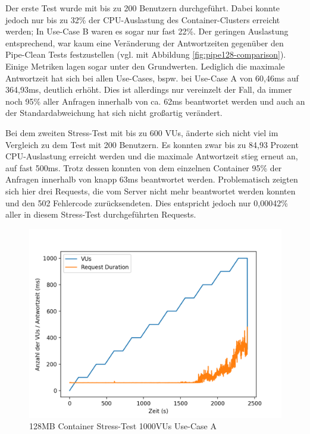 Der erste Test wurde mit bis zu 200 Benutzern durchgeführt. Dabei konnte jedoch nur bis zu 32\% der CPU-Auslastung des Container-Clusters erreicht werden; In Use-Case B waren es sogar nur fast 22\%. Der geringen Auslastung entsprechend, war kaum eine Veränderung der Antwortzeiten gegenüber den Pipe-Clean Tests festzustellen (vgl. mit Abbildung \ref{fig:pipe128-comparison}). Einige Metriken lagen sogar unter den Grundwerten. Lediglich die maximale Antwortzeit hat sich bei allen Use-Cases, bspw. bei Use-Case A von 60,46ms auf 364,93ms, deutlich erhöht. Dies ist allerdings nur vereinzelt der Fall, da immer noch 95\% aller Anfragen innerhalb von ca. 62ms beantwortet werden und auch an der Standardabweichung hat sich nicht großartig verändert. 

Bei dem zweiten Stress-Test mit bis zu 600 VUs, änderte sich nicht viel im Vergleich zu dem Test mit 200 Benutzern. Es konnten zwar bis zu 84,93 Prozent CPU-Auslastung erreicht werden und die maximale Antwortzeit stieg erneut an, auf fast 500ms. Trotz dessen konnten von dem einzelnen Container 95\% der Anfragen innerhalb von knapp 63ms beantwortet werden. Problematisch zeigten sich hier drei Requests, die vom Server nicht mehr beantwortet werden konnten und den 502 Fehlercode zurücksendeten. Dies entspricht jedoch nur 0,00042\% aller in diesem Stress-Test durchgeführten Requests.

\begin{figure}[H]
    \includegraphics[width=\textwidth]{img/fargate128-stress1000.png}
    \caption[Container Stress-Test 1000VUs]{128MB Container Stress-Test 1000VUs Use-Case A}
    \label{fig:fargate128-stress1000}
\end{figure}

